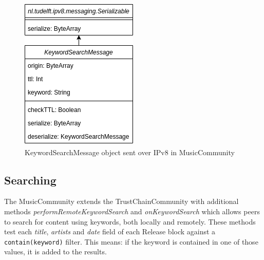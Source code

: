 \begin{figure}
        \includegraphics[width=\linewidth]{implementation/keyword-search-message.png}
        \caption{KeywordSearchMessage object sent over IPv8 in MusicCommunity}
        \label{fig:keyword-search-message}
    \endminipage\hfill
    \endminipage
\end{figure}
\subsection{Searching}
The MusicCommunity extends the TrustChainCommunity with additional methods \textit{performRemoteKeywordSearch} and \textit{onKeywordSearch} which allows peers to search for content using keywords, both locally and remotely. These methods test each \textit{title}, \textit{artists} and \textit{date} field of each Release block against a \verb|contain(keyword)| filter. This means: if the keyword is contained in one of those values, it is added to the results.

